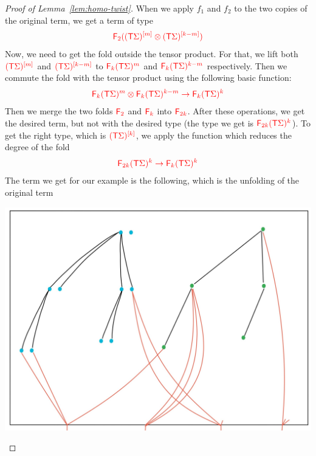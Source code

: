 \begin{proof}[Proof of Lemma~\ref{lem:homo-twist}]
When we apply $f_1$ and $f_2$ to the two copies of the original term, we get a term of type 
\begin{align*}
\ranked{ \reduce 2 (\mati m {(\tmonad \Sigma)}\otimes  \mati {k-m} {(\tmonad\Sigma)})}
\end{align*}
Now, we need to get the fold outside the tensor product. For that, we lift both $\ranked{\mati m {(\tmonad \Sigma)}}$ and $\ranked{\mati {k-m} {(\tmonad \Sigma)}}$ to $\ranked{\reduce k (\tmonad \Sigma)^m}$ and $\ranked{\reduce k (\tmonad \Sigma)^{k-m}}$ respectively. Then we commute the fold with the tensor product using the following basic function:
\begin{align*}
\ranked{\reduce k (\tmonad \Sigma)^m\otimes\reduce k (\tmonad \Sigma)^{k-m}\to \reduce k (\tmonad \Sigma)^k}
\end{align*}
Then we merge the two  folds $\reduce 2$ and $\reduce k$ into $\reduce {2k}$. After these operations, we get the desired term, but not with the desired type (the type we get is $\ranked{\reduce {2k} (\tmonad\Sigma)^k}$). To get the right type, which is $\ranked{\mati k {(\tmonad\Sigma)}}$, we apply the  function which reduces the degree of the fold
\begin{align*}
\ranked{\reduce {2k} (\tmonad \Sigma)^k \to \reduce {k} (\tmonad \Sigma)^k}
 \end{align*}
 The term we get for our example is the following, which is the unfolding of the original term
 \begin{center}
 \includegraphics[scale=.08]{MyPic31.jpg}
 \end{center}


\end{proof}
